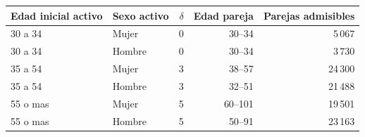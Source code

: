 \begin{tabular}{@{}llrrr@{}}
\toprule
Edad inicial activo & Sexo activo & $\delta$ & Edad pareja & Parejas admisibles \\
\midrule
30 a 34 & Mujer & 0 & 30--34 & 5\,067 \\
30 a 34 & Hombre & 0 & 30--34 & 3\,730 \\
35 a 54 & Mujer & 3 & 38--57 & 24\,300 \\
35 a 54 & Hombre & 3 & 32--51 & 21\,488 \\
55 o mas & Mujer & 5 & 60--101 & 19\,501 \\
55 o mas & Hombre & 5 & 50--91 & 23\,163 \\
\bottomrule
\end{tabular}
